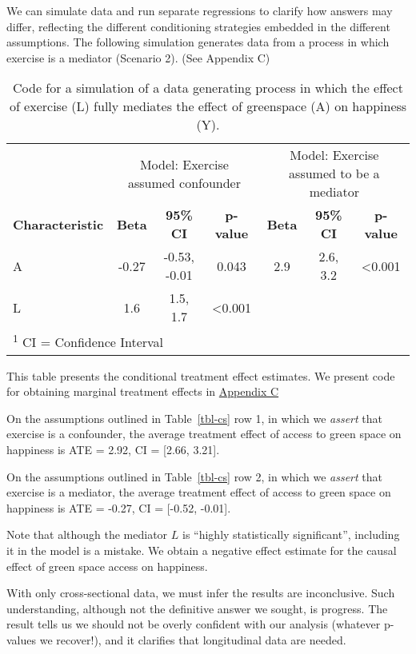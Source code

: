 \documentclass[
  singlecolumn]{article}
\begin{document}
We can simulate data and run separate regressions to clarify how answers
may differ, reflecting the different conditioning strategies embedded in
the different assumptions. The following simulation generates data from
a process in which exercise is a mediator (Scenario 2). (See Appendix C)

\begin{table}
\caption{Code for a simulation of a data generating process in which the effect
of exercise (L) fully mediates the effect of greenspace (A) on happiness
(Y).}\tabularnewline

\centering
\begin{tabular}{lcccccc}
\toprule
\multicolumn{1}{c}{ } & \multicolumn{3}{c}{Model: Exercise assumed confounder} & \multicolumn{3}{c}{Model: Exercise assumed to be a mediator} \\
\cmidrule(l{3pt}r{3pt}){2-4} \cmidrule(l{3pt}r{3pt}){5-7}
\textbf{Characteristic} & \textbf{Beta} & \textbf{95\% CI} & \textbf{p-value} & \textbf{Beta} & \textbf{95\% CI} & \textbf{p-value}\\
\midrule
A & -0.27 & -0.53, -0.01 & 0.043 & 2.9 & 2.6, 3.2 & <0.001\\
L & 1.6 & 1.5, 1.7 & <0.001 &  &  & \\
\bottomrule
\multicolumn{7}{l}{\rule{0pt}{1em}\textsuperscript{1} CI = Confidence Interval}\\
\end{tabular}
\end{table}

This table presents the conditional treatment effect estimates. We
present code for obtaining marginal treatment effects in
\hyperref[appendix-c]{Appendix C}

On the assumptions outlined in Table~\ref{tbl-cs} row 1, in which we
\emph{assert} that exercise is a confounder, the average treatment
effect of access to green space on happiness is ATE = 2.92, CI =
{[}2.66, 3.21{]}.

On the assumptions outlined in Table~\ref{tbl-cs} row 2, in which we
\emph{assert} that exercise is a mediator, the average treatment effect
of access to green space on happiness is ATE = -0.27, CI = {[}-0.52,
-0.01{]}.

Note that although the mediator \(L\) is ``highly statistically
significant'', including it in the model is a mistake. We obtain a
negative effect estimate for the causal effect of green space access on
happiness.

With only cross-sectional data, we must infer the results are
inconclusive. Such understanding, although not the definitive answer we
sought, is progress. The result tells us we should not be overly
confident with our analysis (whatever p-values we recover!), and it
clarifies that longitudinal data are needed.
\end{document}
